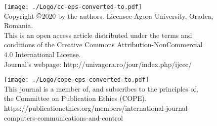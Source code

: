 \documentclass[11pt,a4paper]{article}
\begin{document}
\begin{figure*}[h!]
\texttt{[image: ./Logo/cc-eps-converted-to.pdf]}\\
Copyright $\copyright$2020 by the authors. Licensee Agora University, Oradea, Romania.\\
 This is an open access article distributed under the terms and conditions of the Creative Commons Attribution-NonCommercial 4.0 International License.\\
Journal's webpage: http://univagora.ro/jour/index.php/ijccc/ \\
\end{figure*}
\begin{figure*}[h!]
\centering
\texttt{[image: ./Logo/cope-eps-converted-to.pdf]}\\
This journal is a member of, and subscribes to the principles of,\\
 the Committee on Publication Ethics (COPE).\\
 https://publicationethics.org/members/international-journal-computers-communications-and-control
\end{figure*}

\label{LastPage}
\end{document}
